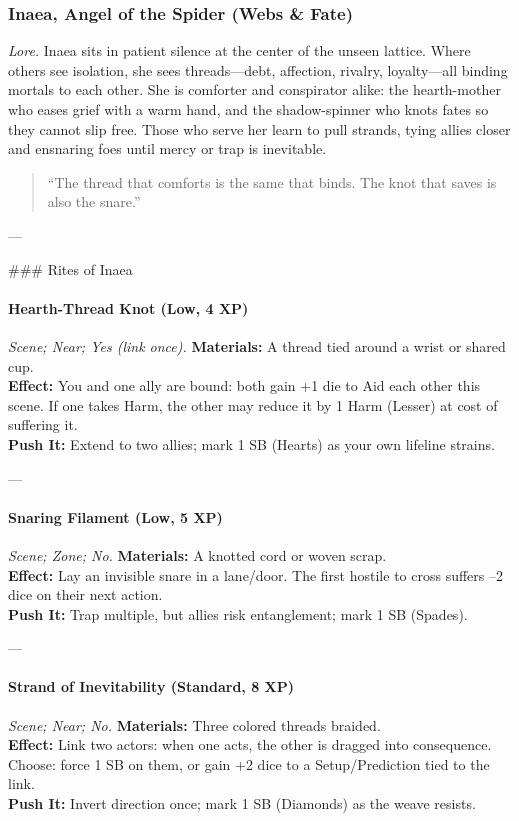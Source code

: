 
\subsubsection{Inaea, Angel of the Spider (Webs \& Fate)}
\textit{Lore.} Inaea sits in patient silence at the center of the unseen lattice. Where others see isolation, she sees threads—debt, affection, rivalry, loyalty—all binding mortals to each other. She is comforter and conspirator alike: the hearth-mother who eases grief with a warm hand, and the shadow-spinner who knots fates so they cannot slip free. Those who serve her learn to pull strands, tying allies closer and ensnaring foes until mercy or trap is inevitable.

\begin{quote}
“The thread that comforts is the same that binds. The knot that saves is also the snare.”  
\end{quote}

---

### Rites of Inaea

\paragraph*{Hearth-Thread Knot (Low, 4 XP)} \emph{Scene; Near; Yes (link once).}  
\textbf{Materials:} A thread tied around a wrist or shared cup.\\
\textbf{Effect:} You and one ally are bound: both gain +1 die to Aid each other this scene. If one takes Harm, the other may reduce it by 1 Harm (Lesser) at cost of suffering it.\\
\textbf{Push It:} Extend to two allies; mark 1 SB (Hearts) as your own lifeline strains.  

---

\paragraph*{Snaring Filament (Low, 5 XP)} \emph{Scene; Zone; No.}  
\textbf{Materials:} A knotted cord or woven scrap.\\
\textbf{Effect:} Lay an invisible snare in a lane/door. The first hostile to cross suffers –2 dice on their next action.\\
\textbf{Push It:} Trap multiple, but allies risk entanglement; mark 1 SB (Spades).  

---

\paragraph*{Strand of Inevitability (Standard, 8 XP)} \emph{Scene; Near; No.}  
\textbf{Materials:} Three colored threads braided.\\
\textbf{Effect:} Link two actors: when one acts, the other is dragged into consequence. Choose: force 1 SB on them, or gain +2 dice to a Setup/Prediction tied to the link.\\
\textbf{Push It:} Invert direction once; mark 1 SB (Diamonds) as the weave resists.  

